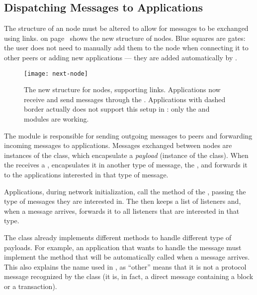 \subsection{Dispatching Messages to Applications}\label{subsec:dispatcher}

The structure of an \iblock{} node must be altered to allow for messages to be
exchanged using links.  on page~\pageref{fig:next-node}
shows the new structure of nodes. Blue squares are gates: the user does not
need to manually add them to the node when connecting it to other peers or
adding new applications --- they are added automatically by \omnetpp{}.

\begin{figure}[tbhp]
	\centering
	\texttt{[image: next-node]}
	\caption{The new structure for nodes, supporting \omnetpp{} links.
	Applications now receive and send messages through the
	. Applications with dashed border actually does
	not support this setup in \iblock{}: only the  and
	 modules are working.}\label{fig:next-node}
\end{figure}

The  module is responsible for sending outgoing messages to
peers and forwarding incoming messages to applications. Messages exchanged
between nodes are instances of the  class, which encapsulate a
\emph{payload} (instance of the  class). When the
 receives a , encapsulates it in another type of
message, the , and forwards it to the applications
interested in that type of message.

Applications, during network initialization, call the 
method of the , passing the type of messages they are
interested in. The  then keeps a list of listeners and, when a
message arrives, forwards it to all listeners that are interested in that type.

The  class already implements different methods to handle
different type of payloads. For example, an application that wants to handle
the  message must implement the 
method that will be automatically called when a  message
arrives. This also explains the name  used in
, as ``other'' means that it is not a protocol
message recognized by the  class (it is, in fact, a direct
message containing a block or a transaction).

